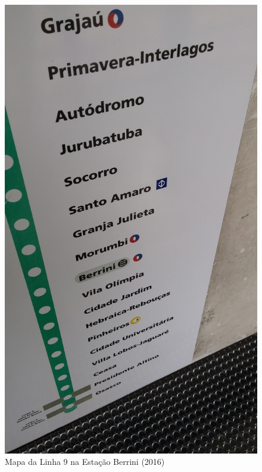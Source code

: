 	\begin{figure}
		\includegraphics[width=0.9\linewidth]{fotos/20160128_170648.jpg}
		\caption{Mapa da Linha 9 na Estação Berrini (2016)}
	\end{figure}
	

